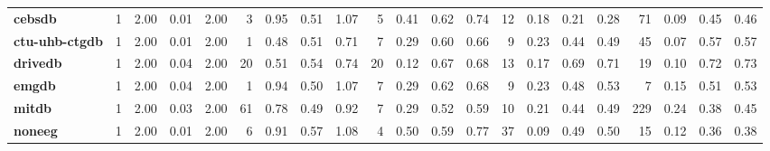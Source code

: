 \begin{tabular}{l|rrrr|rrrr|rrrr|rrrr|rrrr}
	\textbf{cebsdb       } &        1 &                     2.00 &                  0.01 &          2.00 &    3 &                     0.95 &                  0.51 &          1.07 &               5 &                     0.41 &                  0.62 &          0.74 &               12 &                     0.18 &                  0.21 &          0.28 &      71 &                     0.09 &                  0.45 &          0.46 \\
	\textbf{ctu-uhb-ctgdb} &        1 &                     2.00 &                  0.01 &          2.00 &    1 &                     0.48 &                  0.51 &          0.71 &               7 &                     0.29 &                  0.60 &          0.66 &                9 &                     0.23 &                  0.44 &          0.49 &      45 &                     0.07 &                  0.57 &          0.57 \\
	\textbf{drivedb      } &        1 &                     2.00 &                  0.04 &          2.00 &   20 &                     0.51 &                  0.54 &          0.74 &              20 &                     0.12 &                  0.67 &          0.68 &               13 &                     0.17 &                  0.69 &          0.71 &      19 &                     0.10 &                  0.72 &          0.73 \\
	\textbf{emgdb        } &        1 &                     2.00 &                  0.04 &          2.00 &    1 &                     0.94 &                  0.50 &          1.07 &               7 &                     0.29 &                  0.62 &          0.68 &                9 &                     0.23 &                  0.48 &          0.53 &       7 &                     0.15 &                  0.51 &          0.53 \\
	\textbf{mitdb        } &        1 &                     2.00 &                  0.03 &          2.00 &   61 &                     0.78 &                  0.49 &          0.92 &               7 &                     0.29 &                  0.52 &          0.59 &               10 &                     0.21 &                  0.44 &          0.49 &     229 &                     0.24 &                  0.38 &          0.45 \\
	\textbf{noneeg       } &        1 &                     2.00 &                  0.01 &          2.00 &    6 &                     0.91 &                  0.57 &          1.08 &               4 &                     0.50 &                  0.59 &          0.77 &               37 &                     0.09 &                  0.49 &          0.50 &      15 &                     0.12 &                  0.36 &          0.38 \\

\end{tabular}
